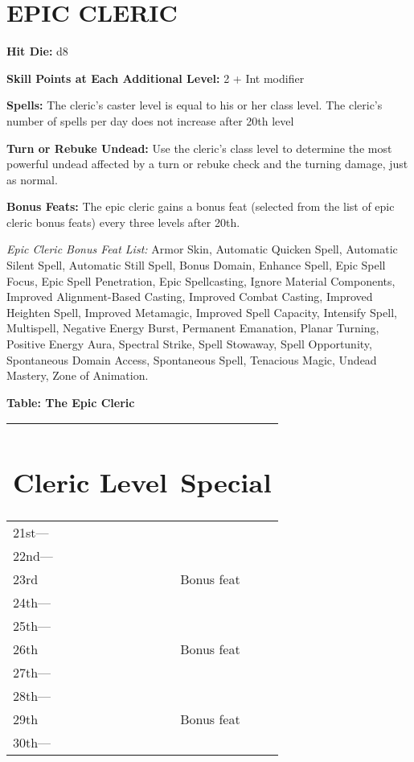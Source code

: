 \documentclass{article}
\begin{document}
\vspace{12pt}
\section*{{\LARGE{}EPIC CLERIC }}

\textbf{Hit Die:} d8

\textbf{Skill Points at Each Additional Level:} 2 + Int modifier

\textbf{Spells:} The cleric's caster level is equal to his or her class level. 
The cleric's number of spells per day does not increase after 20th level

\textbf{Turn or Rebuke Undead:} Use the cleric's class level to determine the most 
powerful undead affected by a turn or rebuke check and the turning damage, just 
as normal. 

\textbf{Bonus Feats:} The epic cleric gains a bonus feat (selected from the list 
of epic cleric bonus feats) every three levels after 20th. 

\textit{Epic Cleric Bonus Feat List: }Armor Skin, Automatic Quicken Spell, Automatic 
Silent Spell, Automatic Still Spell, Bonus Domain, Enhance Spell, Epic Spell Focus, 
Epic Spell Penetration, Epic Spellcasting, Ignore Material Components, Improved 
Alignment-Based Casting, Improved Combat Casting, Improved Heighten Spell, Improved 
Metamagic, Improved Spell Capacity, Intensify Spell, Multispell, Negative Energy 
Burst, Permanent Emanation, Planar Turning, Positive Energy Aura, Spectral Strike, 
Spell Stowaway, Spell Opportunity, Spontaneous Domain Access, Spontaneous Spell, 
Tenacious Magic, Undead Mastery, Zone of Animation. 

\vspace{12pt}
\textbf{Table: The Epic Cleric }

\begin{tabular}{|>{\raggedright}p{38pt}|>{\raggedright}p{60pt}|}
\hline
\section*{C\textbf{leric Level}} & \section*{S\textbf{pecial }}\tabularnewline
\hline
21st--- &  \tabularnewline
\hline
22nd--- &  \tabularnewline
\hline
23rd & Bonus feat \tabularnewline
\hline
24th--- & \tabularnewline
\hline
25th--- & \tabularnewline
\hline
26th & Bonus feat \tabularnewline
\hline
27th--- &  \tabularnewline
\hline
28th--- &  \tabularnewline
\hline
29th & Bonus feat \tabularnewline
\hline
30th--- &  \tabularnewline
\hline
\end{tabular}
\end{document}
